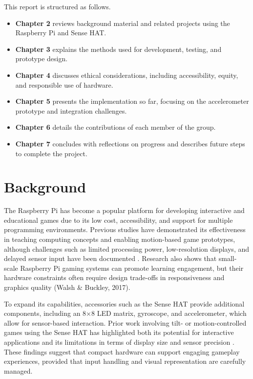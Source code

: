 \documentclass[12pt]{report}
\begin{document}
\label{sec:thesis-outline}

This report is structured as follows.

\begin{itemize}
    \item \textbf{Chapter 2} reviews background material and related projects using the Raspberry Pi and Sense HAT.
    \item \textbf{Chapter 3} explains the methods used for development, testing, and prototype design.
    \item \textbf{Chapter 4} discusses ethical considerations, including accessibility, equity, and responsible use of hardware.
    \item \textbf{Chapter 5} presents the implementation so far, focusing on the accelerometer prototype and integration challenges.
    \item \textbf{Chapter 6} details the contributions of each member of the group.
    \item \textbf{Chapter 7} concludes with reflections on progress and describes future steps to complete the project.
\end{itemize}
\chapter{Background}
\label{cha:background}

The Raspberry Pi has become a popular platform for developing interactive and educational games due to its low cost, accessibility, and support for multiple programming environments. Previous studies have demonstrated its effectiveness in teaching computing concepts and enabling motion-based game prototypes, although challenges such as limited processing power, low-resolution displays, and delayed sensor input have been documented \cite{Kolling2016}. Research also shows that small-scale Raspberry Pi gaming systems can promote learning engagement, but their hardware constraints often require design trade-offs in responsiveness and graphics quality (Walsh \& Buckley, 2017).

To expand its capabilities, accessories such as the Sense HAT provide additional components, including an 8×8 LED matrix, gyroscope, and accelerometer, which allow for sensor-based interaction. Prior work involving tilt- or motion-controlled games using the Sense HAT has highlighted both its potential for interactive applications and its limitations in terms of display size and sensor precision \cite{Saha2016}. These findings suggest that compact hardware can support engaging gameplay experiences, provided that input handling and visual representation are carefully managed.
\end{document}
